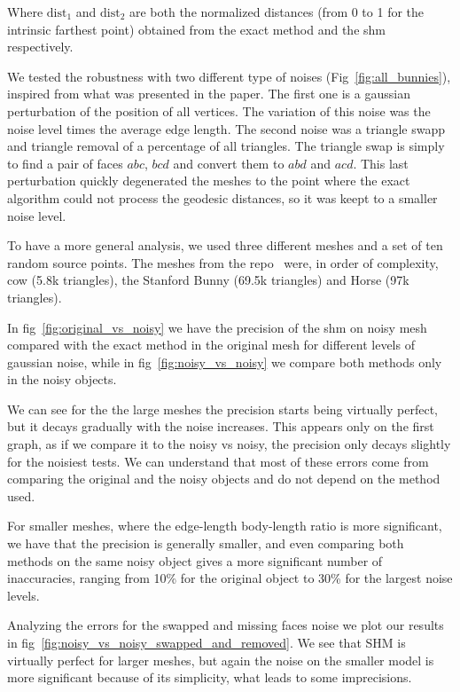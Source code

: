 \documentclass[sigconf]{acmart}
\begin{document}
Where $\text{dist}_1$ and $\text{dist}_2$ are both the normalized distances (from 0 to 1 for the intrinsic farthest point) obtained from the exact method and the shm respectively.

We tested the robustness with two different type of noises (Fig~\ref{fig:all_bunnies}), inspired from what was presented in the paper. 
The first one is a gaussian perturbation of the position of all vertices. The variation of this noise was the noise level times the average edge length.
The second noise was a triangle swapp and triangle removal of a percentage of all triangles.
The triangle swap is simply to find a pair of faces $abc$, $bcd$ and convert them to $abd$ and $acd$.
This last perturbation quickly degenerated the meshes to the point where the exact algorithm could not
process the geodesic distances, so it was keept to a smaller noise level. 

To have a more general analysis, we used three different meshes and a set of ten random
source points. The meshes from the repo~\cite{github_objects_repo} were, in order of complexity, cow (5.8k triangles), the Stanford Bunny (69.5k triangles) and Horse (97k triangles).

In fig~\ref{fig:original_vs_noisy} we have the precision of the shm on noisy mesh compared with the exact method in the original mesh for
different levels of gaussian noise, while in fig~\ref{fig:noisy_vs_noisy} we compare both methods only in the noisy objects.

We can see for the the large meshes the precision starts being virtually perfect, but it
decays gradually with the noise increases. This appears only on the first graph, as if we compare it to the noisy vs noisy, the precision
only decays slightly for the noisiest tests. We can understand that most of these errors come from comparing the original and the noisy objects
and do not depend on the method used.

For smaller meshes, where the edge-length body-length ratio is more significant, we have that the precision is generally smaller,
and even comparing both methods on the same noisy object gives a more significant number of inaccuracies, ranging from 10\% for the
original object to 30\% for the largest noise levels.

Analyzing the errors for the swapped and missing faces noise we plot our results
in fig~\ref{fig:noisy_vs_noisy_swapped_and_removed}. We see that SHM is virtually perfect
for larger meshes, but again the noise on the smaller model is more significant because
of its simplicity, what leads to some imprecisions. 
\end{document}
